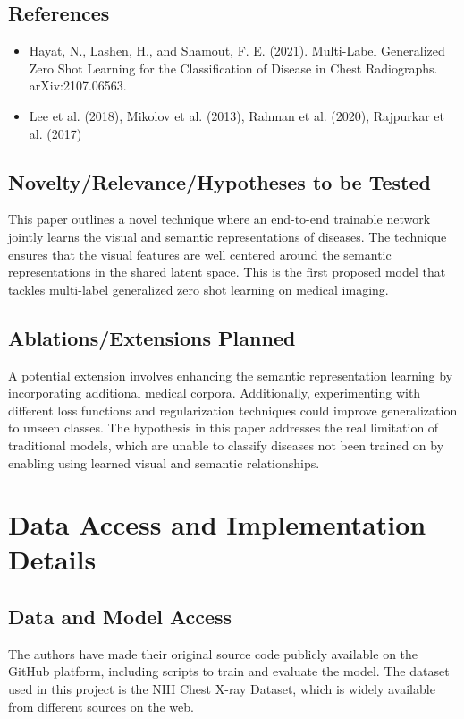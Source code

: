\documentclass[letterpaper]{article} %
\begin{document}
\subsection{References}
\begin{itemize}
    \item Hayat, N., Lashen, H., and Shamout, F. E. (2021). Multi-Label Generalized Zero Shot Learning for the Classification of Disease in Chest Radiographs. arXiv:2107.06563.
    \item Lee et al. (2018), Mikolov et al. (2013), Rahman et al. (2020), Rajpurkar et al. (2017)
\end{itemize}

\subsection{Novelty/Relevance/Hypotheses to be Tested}

This paper outlines a novel technique where an end-to-end trainable network jointly
learns the visual and semantic representations of diseases. The technique ensures that
the visual features are well centered around the semantic representations in the
shared latent space. This is the first proposed model that tackles multi-label
generalized zero shot learning on medical imaging.

\subsection{Ablations/Extensions Planned}

A potential extension involves enhancing the semantic representation learning by
incorporating additional medical corpora. Additionally, experimenting with different
loss functions and regularization techniques could improve generalization to
unseen classes. The hypothesis in this paper addresses the real limitation of
traditional models, which are unable to classify diseases not been trained on by
enabling using learned visual and semantic relationships.

\section{Data Access and Implementation Details}

\subsection{Data and Model Access}

The authors have made their original source code publicly available on the GitHub
platform, including scripts to train and evaluate the model. The dataset used in this
project is the NIH Chest X-ray Dataset, which is widely available from different
sources on the web.
\end{document}
